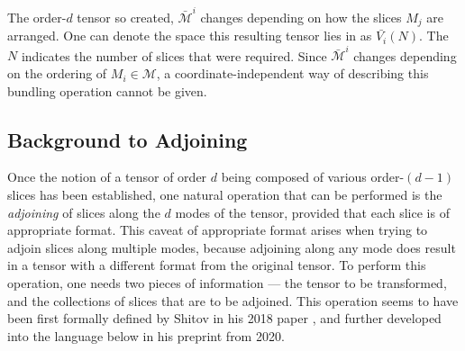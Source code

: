 \documentclass[../Lael_John_MasterThesis_Draft.tex]{subfiles}
\begin{document}
\begin{remark}
    The order-$d$ tensor so created, $\bar{\mathcal{M}}^i$ changes depending on how the slices $M_j$ are arranged. One can denote the space this resulting tensor lies in as $\bar{V_i}(N)$. The $N$ indicates the number of slices that were required. Since $\bar{\mathcal{M}}^i$ changes depending on the ordering of $M_i \in \mathcal{M}$, a coordinate-independent way of describing this bundling operation cannot be given.
\end{remark}
\subsection{Background to Adjoining}\label{subsection:backgroundadjoining}
Once the notion of a tensor of order $d$ being composed of various order-$(d-1)$ slices has been established, one natural operation that can be performed is the \textit{adjoining} of slices along the $d$ modes of the tensor, provided that each slice is of appropriate format. This caveat of appropriate format arises when trying to adjoin slices along multiple modes, because adjoining along any mode does result in a tensor with a different format from the original tensor. To perform this operation, one needs two pieces of information --- the tensor to be transformed, and the collections of slices that are to be adjoined. This operation seems to have been first formally defined by Shitov in his 2018 paper \cite{shitov_counterexample_2018}, and further developed into the language below in his preprint from 2020\cite{shitov_comons_2020}. 

\end{document}
